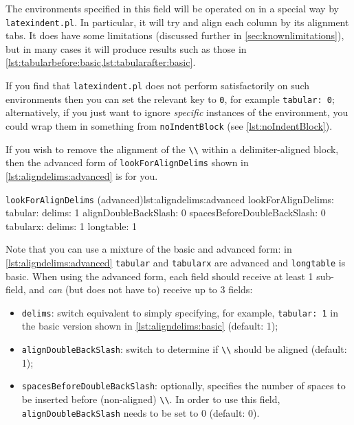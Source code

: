 \documentclass[10pt]{article}
\begin{document}
The environments specified in this field will be operated on in a special way  by \texttt{latexindent.pl}. In particular, it will try and align each column by its alignment
tabs. It does have some limitations (discussed further in \cref{sec:knownlimitations}),
but in many cases it will produce results such as those in \cref{lst:tabularbefore:basic,lst:tabularafter:basic}.

If you find that \texttt{latexindent.pl} does not perform satisfactorily on such
environments then you can set the relevant key to \texttt{0}, for example \texttt{tabular: 0}; alternatively, if you just want to ignore \emph{specific}
instances of the environment, you could wrap them in something from \texttt{noIndentBlock} (see \cref{lst:noIndentBlock}).

\begin{minipage}{.45\textwidth}
\end{minipage}%
\hfill
\begin{minipage}{.45\textwidth}
\end{minipage}%

If you wish to remove the alignment of the \lstinline!\\! within a delimiter-aligned block, then the
advanced form of \texttt{lookForAlignDelims} shown in \cref{lst:aligndelims:advanced} is for you.
\begin{yaml}[firstnumber=77]{\texttt{lookForAlignDelims} (advanced)}{lst:aligndelims:advanced}
lookForAlignDelims:
   tabular: 
      delims: 1
      alignDoubleBackSlash: 0
      spacesBeforeDoubleBackSlash: 0
   tabularx:
      delims: 1
   longtable: 1
	\end{yaml}

Note that you can use a mixture of the basic and advanced form: in \cref{lst:aligndelims:advanced} \texttt{tabular} and \texttt{tabularx}
are advanced and \texttt{longtable} is basic. When using the advanced form, each field should receive at least 1 sub-field, and \emph{can} (but does not have to) receive up to 3 fields:
\begin{itemize}
	\item \texttt{delims}: switch equivalent to simply specifying, for example, \texttt{tabular: 1} in
	      the basic version shown in \cref{lst:aligndelims:basic} (default: 1);
	\item \texttt{alignDoubleBackSlash}: switch to determine if \lstinline!\\! should be aligned (default: 1);
	\item \texttt{spacesBeforeDoubleBackSlash}: optionally, specifies the number of spaces to be inserted
	      before (non-aligned) \lstinline!\\!. In order to use this field, \texttt{alignDoubleBackSlash} needs
	      to be set to 0 (default: 0).
\end{itemize}
\end{document}
